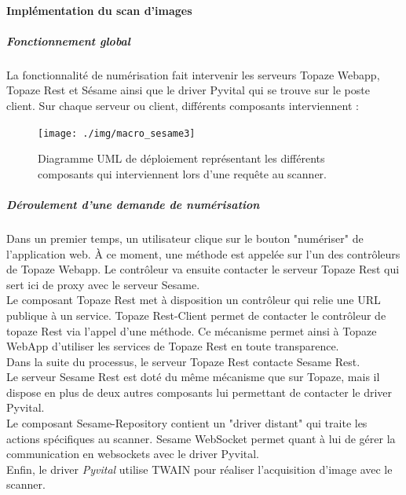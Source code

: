 \paragraph*{Implémentation du scan d'images}
\subparagraph*{Fonctionnement global}
La fonctionnalité de numérisation fait intervenir les serveurs Topaze Webapp, Topaze Rest et Sésame ainsi que le driver Pyvital qui se trouve sur le poste client.
Sur chaque serveur ou client, différents composants interviennent :
\begin{figure}[H]
  \centering
  \texttt{[image: ./img/macro\_sesame3]}
  \caption{\label{fig:mb_va_ast} Diagramme UML de déploiement représentant les différents composants qui interviennent lors d'une requête au scanner.}
\end{figure}

\subparagraph*{Déroulement d'une demande de numérisation}
Dans un premier temps, un utilisateur clique sur le bouton "numériser" de l'application web. À ce moment, une méthode est appelée sur l'un des contrôleurs de Topaze Webapp. Le contrôleur va ensuite contacter le serveur Topaze Rest qui sert ici de proxy avec le serveur Sesame. \\
Le composant Topaze Rest met à disposition un contrôleur qui relie une URL publique à un service. Topaze Rest-Client permet de contacter le contrôleur de topaze Rest via l'appel d'une méthode. Ce mécanisme permet ainsi à Topaze WebApp d'utiliser les services de Topaze Rest en toute transparence. \\
Dans la suite du processus, le serveur Topaze Rest contacte Sesame Rest. \\
Le serveur Sesame Rest est doté du même mécanisme que sur Topaze, mais il dispose en plus de deux autres composants lui permettant de contacter le driver Pyvital.\\
Le composant Sesame-Repository contient un "driver distant" qui traite les actions spécifiques au scanner. Sesame WebSocket permet quant à lui de gérer la communication en websockets avec le driver Pyvital.\\
Enfin, le driver \textit{Pyvital} utilise TWAIN pour réaliser l'acquisition d'image avec le scanner.\\

